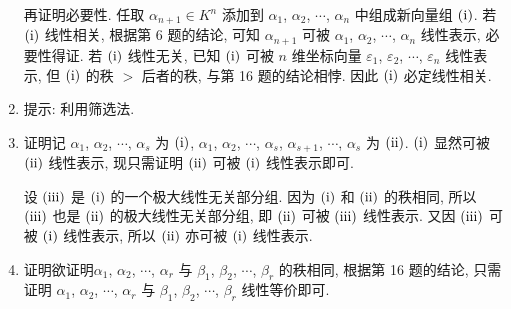 \documentclass[a4paper, 11pt]{ctexart}
\begin{document}
\begin{enumerate}
            再证明必要性. 任取 $\alpha_{n+1} \in K^n$ 添加到 $\alpha_1$, $\alpha_2$, $\cdots$, $\alpha_n$ 中组成新向量组 $(\mathrm{\uppercase\expandafter{\romannumeral1}})$. 若 $(\mathrm{\uppercase\expandafter{\romannumeral1}})$ 线性相关, 根据{\heiti 第 6 题}的结论, 可知 $\alpha_{n+1}$ 可被 $\alpha_1$, $\alpha_2$, $\cdots$, $\alpha_n$ 线性表示, 必要性得证.
            若 $(\mathrm{\uppercase\expandafter{\romannumeral1}})$ 线性无关, 已知 $(\mathrm{\uppercase\expandafter{\romannumeral1}})$ 可被 $n$ 维坐标向量 $\varepsilon_1$, $\varepsilon_2$, $\cdots$, $\varepsilon_n$ 线性表示, 但 $(\mathrm{\uppercase\expandafter{\romannumeral1}})$ 的秩 $>$ 后者的秩, 与{\heiti 第 16 题}的结论相悖. 因此 $(\mathrm{\uppercase\expandafter{\romannumeral1}})$ 必定线性相关.
        \item %
            提示: 利用筛选法.
        \item %
            {\heiti 证明}\quad 记 $\alpha_1$, $\alpha_2$, $\cdots$, $\alpha_s$ 为 $(\mathrm{\uppercase\expandafter{\romannumeral1}})$,
            $\alpha_1$, $\alpha_2$, $\cdots$, $\alpha_s$, $\alpha_{s+1}$, $\cdots$, $\alpha_s$ 为 $(\mathrm{\uppercase\expandafter{\romannumeral2}})$.
            $(\mathrm{\uppercase\expandafter{\romannumeral1}})$ 显然可被 $(\mathrm{\uppercase\expandafter{\romannumeral2}})$ 线性表示, 现只需证明 $(\mathrm{\uppercase\expandafter{\romannumeral2}})$ 可被 $(\mathrm{\uppercase\expandafter{\romannumeral1}})$ 线性表示即可.

            设 $(\mathrm{\uppercase\expandafter{\romannumeral3}})$ 是 $(\mathrm{\uppercase\expandafter{\romannumeral1}})$ 的一个极大线性无关部分组.
            因为 $(\mathrm{\uppercase\expandafter{\romannumeral1}})$ 和 $(\mathrm{\uppercase\expandafter{\romannumeral2}})$ 的秩相同,
            所以 $(\mathrm{\uppercase\expandafter{\romannumeral3}})$ 也是 $(\mathrm{\uppercase\expandafter{\romannumeral2}})$ 的极大线性无关部分组,
            即 $(\mathrm{\uppercase\expandafter{\romannumeral2}})$ 可被 $(\mathrm{\uppercase\expandafter{\romannumeral3}})$ 线性表示.
            又因 $(\mathrm{\uppercase\expandafter{\romannumeral3}})$ 可被 $(\mathrm{\uppercase\expandafter{\romannumeral1}})$ 线性表示,
            所以 $(\mathrm{\uppercase\expandafter{\romannumeral2}})$ 亦可被 $(\mathrm{\uppercase\expandafter{\romannumeral1}})$ 线性表示.
        \item %
            {\heiti 证明}\quad 欲证明$\alpha_1$, $\alpha_2$, $\cdots$, $\alpha_r$ 与 $\beta_1$, $\beta_2$, $\cdots$, $\beta_r$ 的秩相同,
            根据{\heiti 第 16 题}的结论, 只需证明 $\alpha_1$, $\alpha_2$, $\cdots$, $\alpha_r$ 与 $\beta_1$, $\beta_2$, $\cdots$, $\beta_r$ 线性等价即可.
            

\end{enumerate}
\end{document}

